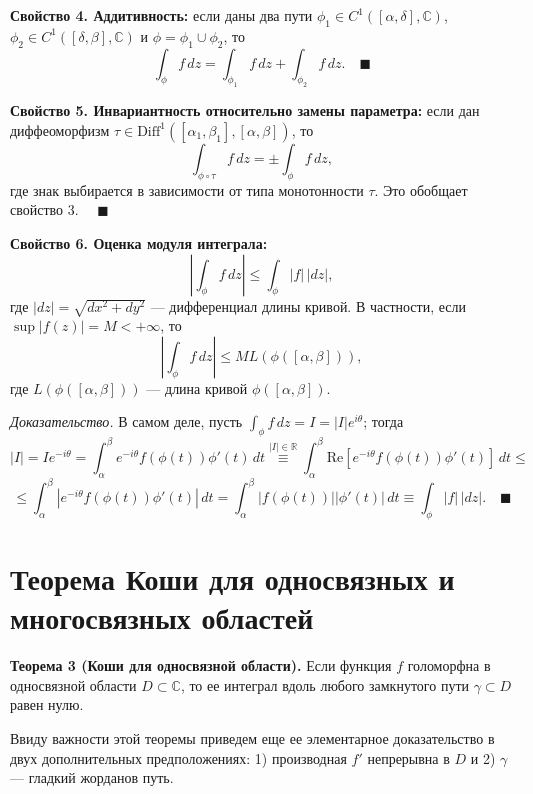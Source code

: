 \documentclass[12pt, a4paper]{article}
\theoremstyle{definition}
\theoremstyle{remark}
\begin{document}
\textbf{Свойство 4. Аддитивность:} если даны два пути $\phi_1 \in C^1([\alpha, \delta], \mathbb{C})$, $\phi_2 \in C^1([\delta, \beta], \mathbb{C})$ и $\phi = \phi_1 \cup \phi_2$, то 
\[
\int_{\phi} f \, dz = \int_{\phi_1} f \, dz + \int_{\phi_2} f \, dz. \quad \blacksquare
\]

\textbf{Свойство 5. Инвариантность относительно замены параметра:} если дан диффеоморфизм $\tau \in \text{Diff}^1([\alpha_1, \beta_1], [\alpha, \beta])$, то 
\[
\int_{\phi \circ \tau} f \, dz = \pm \int_{\phi} f \, dz,
\]
где знак выбирается в зависимости от типа монотонности $\tau$. Это обобщает свойство 3. $\quad \blacksquare$

\textbf{Свойство 6. Оценка модуля интеграла:}
\[
\left| \int_{\phi} f \, dz \right| \le \int_{\phi} |f| \, |dz|,
\]
где $|dz| = \sqrt{dx^2 + dy^2}$ — дифференциал длины кривой. В частности, если $\sup |f(z)| = M < +\infty$, то 
\[
\left| \int_{\phi} f \, dz \right| \le M L(\phi([\alpha, \beta])),
\]
где $L(\phi([\alpha, \beta]))$ — длина кривой $\phi([\alpha, \beta])$.

\textit{Доказательство.} В самом деле, пусть $\int_{\phi} f \, dz = I = |I|e^{i\theta}$; тогда
\[
|I| = I e^{-i\theta} = \int_{\alpha}^{\beta} e^{-i\theta} f(\phi(t))\phi'(t) \, dt \stackrel{|I| \in \mathbb{R}}{\equiv} \int_{\alpha}^{\beta} \text{Re} \left[ e^{-i\theta} f(\phi(t))\phi'(t) \right] \, dt \le
\]
\[
\le \int_{\alpha}^{\beta} \left| e^{-i\theta} f(\phi(t))\phi'(t) \right| \, dt = \int_{\alpha}^{\beta} |f(\phi(t))| |\phi'(t)| \, dt \equiv \int_{\phi} |f| \, |dz|. \quad \blacksquare
\]

\newpage
\section{Теорема Коши для односвязных и многосвязных областей}
\textbf{Теорема 3 (Коши для односвязной области).} Если функция $f$ голоморфна в односвязной области $D \subset \mathbb{C}$, то ее интеграл вдоль любого замкнутого пути $\gamma \subset D$ равен нулю.

Ввиду важности этой теоремы приведем еще ее элементарное доказательство в двух дополнительных предположениях: 1) производная $f'$ непрерывна в $D$ и 2) $\gamma$ — гладкий жорданов путь.
\end{document}
